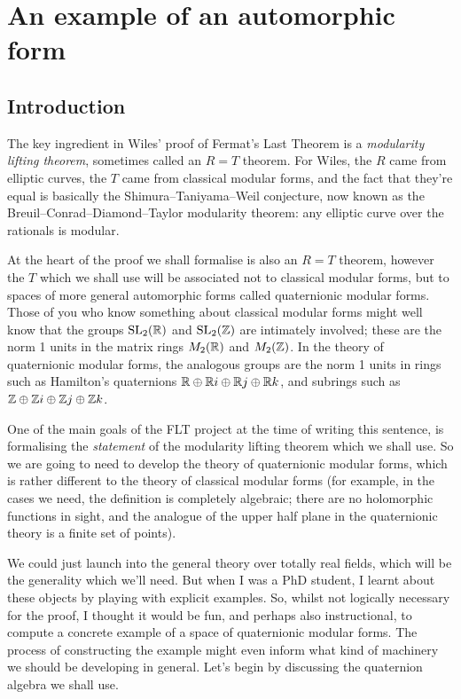 \chapter{An example of an automorphic form}

\section{Introduction}

The key ingredient in Wiles' proof of Fermat's Last Theorem is a \emph{modularity lifting theorem},
sometimes called an $R=T$ theorem. For Wiles, the $R$ came from elliptic curves, the $T$ came from
classical modular forms, and the fact that they're equal is basically the Shimura--Taniyama--Weil
conjecture, now known as the Breuil--Conrad--Diamond--Taylor modularity theorem: any elliptic
curve over the rationals is modular.

At the heart of the proof we shall formalise is also an $R=T$ theorem, however the $T$ which we
shall use will be associated not to classical modular forms, but to spaces of more general
automorphic forms called quaternionic modular forms. Those of you who know something about
classical modular forms might well know that the groups $\operatorname{SL}_2(\mathbb{R})$ and $\operatorname{SL}_2(\mathbb{Z})$ are
intimately involved; these are the norm 1 units in the matrix rings $M_2(\mathbb{R})$ and $M_2(\mathbb{Z})$.
In the theory of quaternionic modular forms, the analogous groups are the norm 1 units
in rings such as Hamilton's quaternions $\mathbb{R}\oplus\mathbb{R} i\oplus\mathbb{R} j\oplus\mathbb{R} k$, and subrings
such as $\mathbb{Z}\oplus\mathbb{Z} i\oplus\mathbb{Z} j\oplus\mathbb{Z} k$.

One of the main goals of the FLT project at the time of writing this sentence, is formalising
the \emph{statement} of the modularity lifting theorem which we shall use. So we are going
to need to develop the theory of quaternionic modular forms, which is rather different
to the theory of classical modular forms (for example, in the cases we need, the definition
is completely algebraic; there are no holomorphic functions in sight, and the analogue
of the upper half plane in the quaternionic theory is a finite set of points).

We could just launch into the general theory over totally real fields, which will be the generality
which we'll need. But when I was a PhD student, I learnt about
these objects by playing with explicit examples. So, whilst not logically necessary for the proof,
I thought it would be fun, and perhaps also instructional, to compute a concrete example of a space
of quaternionic modular forms. The process of constructing the example might even inform what kind
of machinery we should be developing in general. Let's begin by discussing the quaternion algebra
we shall use.

